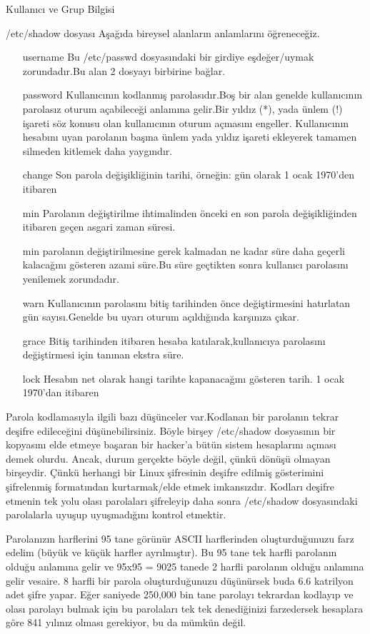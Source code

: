 \begin{section}{Kullanıcı ve Grup Bilgisi}
\begin{subsection}{/etc/shadow dosyası}
Aşağıda bireysel alanların anlamlarını öğreneceğiz.
\begin{itemize}
\item[username]Bu /etc/passwd dosyasındaki bir girdiye eşdeğer/uymak zorundadır.Bu alan 2 dosyayı birbirine bağlar.
\item[password]Kullanıcının kodlanmış parolasıdır.Boş bir alan genelde kullanıcının parolasız oturum açabileceği anlamına gelir.Bir yıldız (*),
yada ünlem (!) işareti söz konusu olan kullanıcının oturum açmasını engeller. Kullanıcının hesabını uyan parolanın başına ünlem yada yıldız
işareti ekleyerek tamamen silmeden kitlemek daha yaygındır.
\item[change]Son parola değişikliğinin tarihi, örneğin: gün olarak 1 ocak 1970'den itibaren
\item[min]Parolanın değiştirilme ihtimalinden önceki en son parola değişikliğinden itibaren geçen asgari zaman süresi.
\item[min]parolanın değiştirilmesine gerek kalmadan ne kadar süre daha geçerli kalacağını gösteren azami süre.Bu süre geçtikten sonra kullanıcı
parolasını yenilemek zorundadır.
\item[warn]Kullanıcının parolasını bitiş tarihinden önce değiştirmesini hatırlatan gün sayısı.Genelde bu uyarı oturum açıldığında karşınıza çıkar.
\item[grace]Bitiş tarihinden itibaren hesaba katılarak,kullanıcıya parolasını değiştirmesi için tanınan ekstra süre.
\item[lock]Hesabın net olarak hangi tarihte kapanacağını gösteren tarih. 1 ocak 1970'dan itibaren
\end{itemize}

Parola kodlamasıyla ilgili bazı düşünceler var.Kodlanan bir parolanın tekrar deşifre edileceğini düşünebilirsiniz. Böyle birşey /etc/shadow dosyasının bir kopyasını elde etmeye başaran bir hacker'a bütün sistem hesaplarını açması demek olurdu. Ancak, durum gerçekte böyle değil, çünkü dönüşü olmayan birşeydir. Çünkü herhangi bir Linux şifresinin deşifre edilmiş gösterimini şifrelenmiş formatından kurtarmak/elde etmek imkansızdır. Kodları deşifre etmenin tek yolu olası parolaları şifreleyip daha sonra /etc/shadow dosyasındaki parolalarla uyuşup uyuşmadığını kontrol etmektir.

Parolanızın harflerini 95 tane görünür ASCII harflerinden oluşturduğunuzu farz edelim (büyük ve küçük harfler ayrılmıştır). Bu 95 tane tek harfli parolanın olduğu anlamına gelir ve 95x95 = 9025 tanede 2 harfli parolanın olduğu anlamına gelir vesaire. 8 harfli bir parola oluşturduğunuzu düşünürsek buda 6.6 katrilyon adet şifre yapar. Eğer saniyede 250,000 bin tane parolayı tekrardan kodlayıp ve olası parolayı bulmak için bu parolaları tek tek denediğinizi farzedersek hesaplara göre 841 yılınız olması gerekiyor, bu da mümkün değil.


\end{subsection}
\end{section}
